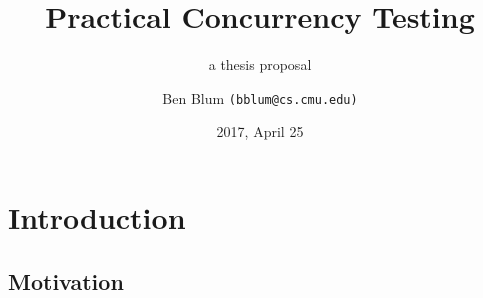\documentclass[xcolor=dvipsnames]{beamer}
\title[Thesis Proposal]{{\bf Practical Concurrency Testing}}
\subtitle[]{a thesis proposal}
\author[Ben Blum]{Ben Blum \texttt{(bblum@cs.cmu.edu)}}
\institute[CMU CSD]{Carnegie Mellon University}
\date[]{2017, April 25}
\begin{document}
\renewcommand{\inserttotalframenumber}{38}
\normalem
\begin{frame}
	\titlepage
\end{frame}


\newcommand\linegap{\vspace{0.2in}}
\newcommand\breakslide[1]{\begin{frame}{} \begin{center} #1 \end{center} \end{frame}}

\section{Introduction}
\subsection{Motivation}
\end{document}
